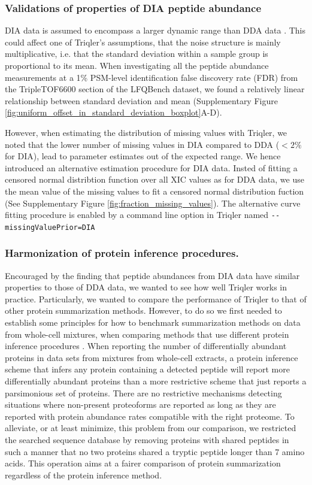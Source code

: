 \documentclass[10pt,letterpaper]{article}
\begin{document}
\subsubsection*{Validations of properties of DIA peptide abundance}

DIA data is assumed to encompass a larger dynamic range than DDA data . This could affect one of Triqler's assumptions, that the noise structure is mainly multiplicative, i.e. that the standard deviation within a sample group is proportional to its mean. When investigating all the peptide abundance measurements at a 1\% PSM-level identification false discovery rate (FDR) from the TripleTOF6600 section of the LFQBench dataset, we found a relatively linear relationship between standard deviation and mean (Supplementary Figure \ref{fig:uniform_offset_in_standard_deviation_boxplot}A-D). 

However, when estimating the distribution of missing values with Triqler, we noted that the lower number of missing values in DIA compared to DDA ($<2\%$ for DIA), lead to parameter estimates out of the expected range. We hence introduced an alternative estimation procedure for DIA data. Insted of fitting a censored normal distribtion function over all XIC values as for DDA data, we use the mean value of the missing values to fit a censored normal distribution fuction (See Supplementary Figure \ref{fig:fraction_missing_values}). The alternative curve fitting procedure is  enabled by a command line option in Triqler named \verb|--missingValuePrior=DIA|

\subsubsection*{Harmonization of protein inference procedures.}

Encouraged by the finding that peptide abundances from DIA data have similar properties to those of DDA data, we wanted to see how well Triqler works in practice. Particularly, we wanted to compare the performance of Triqler to that of other protein summarization methods. However, to do so we first needed to establish some principles for how to benchmark summarization methods on data from whole-cell mixtures, when comparing methods that use different protein inference procedures \cite{serang2012recognizing}. When reporting the number of differentially abundant proteins in data sets from mixtures from whole-cell extracts, a protein inference scheme that infers any protein containing a detected peptide will report more differentially abundant proteins than a more restrictive scheme that just reports a parsimonious set of proteins. There are no restrictive mechanisms detecting situations where non-present proteoforms are reported as long as they are reported with protein abundance rates compatible with the right proteome. To alleviate, or at least minimize, this problem from our comparison, we restricted the searched sequence database by removing proteins with shared peptides in such a manner that no two proteins shared a tryptic peptide longer than 7 amino acids. This operation aims at a fairer comparison of protein summarization regardless of the protein inference method. 
\end{document}
